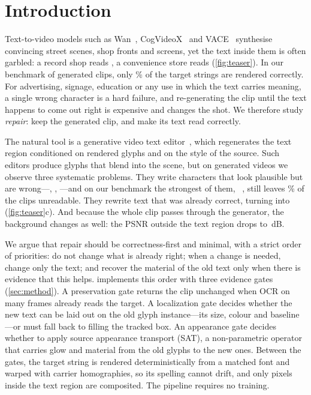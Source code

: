 \section{Introduction}
\label{sec:intro}

Text-to-video models such as Wan~\cite{wan2025wan}, CogVideoX~\cite{yang2025cogvideox} and VACE~\cite{jiang2025vace} synthesise convincing street scenes, shop fronts and screens, yet the text inside them is often garbled: a record shop reads , a convenience store reads  (\cref{fig:teaser}). In our benchmark of generated clips, only \rOrigRead\% of the target strings are rendered correctly. For advertising, signage, education or any use in which the text carries meaning, a single wrong character is a hard failure, and re-generating the clip until the text happens to come out right is expensive and changes the shot. We therefore study \emph{repair}: keep the generated clip, and make its text read correctly.

The natural tool is a generative video text editor~\cite{zeng2026steervte}, which regenerates the text region conditioned on rendered glyphs and on the style of the source. Such editors produce glyphs that blend into the scene, but on generated videos we observe three systematic problems. They write characters that look plausible but are wrong---, , ---and on our benchmark the strongest of them, \steer~\cite{zeng2026steervte}, still leaves \rSteerUnread\% of the clips unreadable. They rewrite text that was already correct, turning  into  (\cref{fig:teaser}c). And because the whole clip passes through the generator, the background changes as well: the PSNR outside the text region drops to \rSteerBG\,dB.

We argue that repair should be correctness-first and minimal, with a strict order of priorities: do not change what is already right; when a change is needed, change only the text; and recover the material of the old text only when there is evidence that this helps. \method implements this order with three evidence gates (\cref{sec:method}). A preservation gate returns the clip unchanged when OCR on many frames already reads the target. A localization gate decides whether the new text can be laid out on the old glyph instance---its size, colour and baseline---or must fall back to filling the tracked box. An appearance gate decides whether to apply source appearance transport (SAT), a non-parametric operator that carries glow and material from the old glyphs to the new ones. Between the gates, the target string is rendered deterministically from a matched font and warped with carrier homographies, so its spelling cannot drift, and only pixels inside the text region are composited. The pipeline requires no training.

